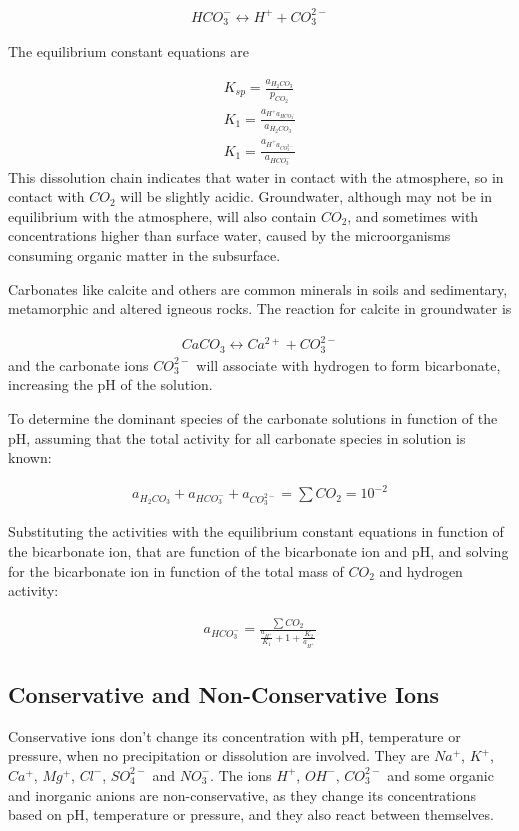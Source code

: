 \documentclass[11pt,twoside]{report}
\begin{document}
\begin{align}
   HCO_{3}^{-} \longleftrightarrow H^{+} + CO_{3}^{2-}
\end{align}

The equilibrium constant equations are

\begin{align}
   K_{sp} = \frac{a_{H_{2}CO_{3}}}{p_{CO_{2}}} \\
   K_{1} = \frac{a_{H^{+}a_{HCO_{3}^{-}}}}{a_{H_{2}CO_{3}}} \\
   K_{1} = \frac{a_{H^{+}a_{CO_{3}^{2-}}}}{a_{HCO_{3}^{-}}} 
\end{align}
This dissolution chain indicates that water in contact with the atmosphere, so in contact with $CO_{2}$ will be slightly acidic. Groundwater, although may not be in equilibrium with the atmosphere, will also contain $CO_{2}$, and sometimes with concentrations higher than surface water, caused by the microorganisms consuming organic matter in the subsurface. 

Carbonates like calcite and others are common minerals in soils and sedimentary, metamorphic and altered igneous rocks. The reaction for calcite in groundwater is 

\begin{align}
   CaCO_{3} \longleftrightarrow Ca^{2+} + CO_{3}^{2-}
\end{align}
and the carbonate ions $CO_{3}^{2-}$ will associate with hydrogen to form bicarbonate, increasing the pH of the solution. 

To determine the dominant species of the carbonate solutions in function of the pH, assuming that the total activity for all carbonate species in solution is known:

\begin{align}
   a_{H_{2}CO_{3}} + a_{HCO_{3}^{-}} + a_{CO_{3}^{2-}} = \sum CO_{2} = 10^{-2}
\end{align}

Substituting the activities with the equilibrium constant equations in function of the bicarbonate ion, that are function of the bicarbonate ion and pH, and solving for the bicarbonate ion in function of the total mass of $CO_{2}$ and hydrogen activity:

\begin{align}
   a_{HCO_{3}^{-}} = \frac{\sum CO_{2}}{\frac{a_{H^{+}}}{K_{1}} +1 + \frac{K_{2}}{a_{H^{+}}}  }
\end{align}

\subsection{Conservative and Non-Conservative Ions}
Conservative ions don't change its concentration with pH, temperature or pressure, when no precipitation or dissolution are involved. They are $Na^{+}$, $K^{+}$, $Ca^{+}$, $Mg^{+}$, $Cl^{-}$, $SO_{4}^{2-}$ and $NO_{3}^{-}$. The ions $H^{+}$, $OH^{-}$, $CO_{3}^{2-}$ and some organic and inorganic anions are non-conservative, as they change its concentrations based on pH, temperature or pressure, and they also react between themselves. 
\end{document}
